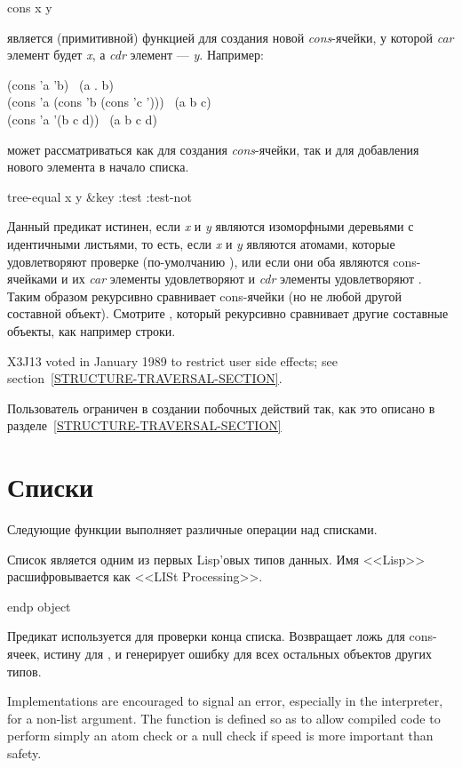 \begin{defun}[Функция]
cons x y

 является (примитивной) функцией для создания новой
\emph{cons}-ячейки, у которой \emph{car} элемент будет \emph{x}, а \emph{cdr}
элемент --- \emph{y}.
Например:
\begin{lisp}
(cons 'a 'b) \EV\ (a . b) \\
(cons 'a (cons 'b (cons 'c '{\emptylist}))) \EV\ (a b c) \\
(cons 'a '(b c d)) \EV\ (a b c d)
\end{lisp}
 может рассматриваться как для создания \emph{cons}-ячейки, так и для
добавления нового элемента в начало списка.
\end{defun}

\begin{defun}[Функция]
tree-equal x y &key :test :test-not

Данный предикат истинен, если \emph{x} и \emph{y} являются изоморфными деревьями
с идентичными листьями, то есть, если \emph{x} и \emph{y} являются атомами,
которые удовлетворяют проверке (по-умолчанию ),
или если они оба являются cons-ячейками и их \emph{car} элементы удовлетворяют
 и \emph{cdr} элементы удовлетворяют .
Таким образом  рекурсивно сравнивает cons-ячейки (но не любой
другой составной объект). Смотрите , который рекурсивно сравнивает
другие составные объекты, как например строки.

\begin{new}
X3J13 voted in January 1989
to restrict user side effects; see section~\ref{STRUCTURE-TRAVERSAL-SECTION}.
\end{new}

Пользователь ограничен в создании побочных действий так, как это описано в
разделе~\ref{STRUCTURE-TRAVERSAL-SECTION}
\end{defun}

\section{Списки}

Следующие функции выполняет различные операции над списками.

Список является одним из первых Lisp'овых типов данных. Имя <<Lisp>>
расшифровывается
как <<LISt Processing>>.

\begin{defun}[Функция]
endp object

Предикат  используется для проверки конца списка. Возвращает ложь для
cons-ячеек, истину для {\nil}, и генерирует ошибку для всех остальных объектов
других типов.

\beforenoterule
\begin{implementation}
Implementations are encouraged to signal an
error, especially in the interpreter, for a non-list argument.
The  function is defined so as to allow compiled code
to perform simply an atom check or a null check if speed is more
important than safety.
\end{implementation}
\afternoterule
\end{defun}

